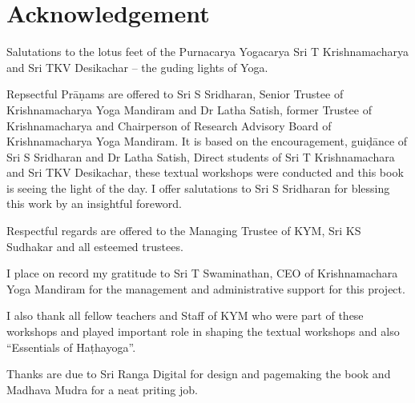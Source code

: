 \thispagestyle{empty}

\chapter*{Acknowledgement}\label{ack}

Salutations to the lotus feet of the Purnacarya Yogacarya Sri T Krishnamacharya and Sri TKV Desikachar – the guding lights of Yoga.

Repsectful Prāṇams are offered to Sri S Sridharan, Senior Trustee of Krishnamacharya Yoga Mandiram and Dr Latha Satish, former Trustee of Krishnamacharya and Chairperson of Research Advisory Board of Krishnamacharya Yoga Mandiram. It is based on the encouragement, guiḍānce of Sri S Sridharan and Dr Latha Satish, Direct students of Sri T Krishnamachara and Sri TKV Desikachar, these textual workshops were conducted and this book is seeing the light of the day. I offer salutations to Sri S Sridharan for blessing this work by an insightful foreword. 

Respectful regards are offered to the Managing Trustee of KYM, Sri KS Sudhakar and all esteemed trustees. 

I place on record my gratitude to Sri T Swaminathan, CEO of Krishnamachara Yoga Mandiram for the management and administrative support for this project. 

I also thank all fellow teachers and Staff of KYM who were part of these workshops and played important role in shaping the textual workshops and also “Essentials of Haṭhayoga”. 

Thanks are due to Sri Ranga Digital for design and pagemaking the book and Madhava Mudra for a neat priting job.

